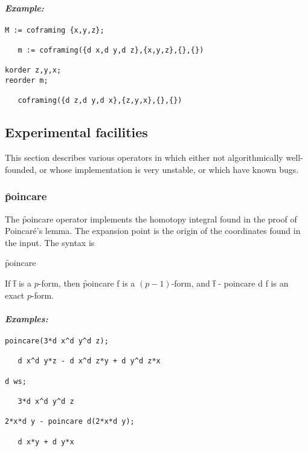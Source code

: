 \paragraph{\textit{Example:}}
\begin{verbatim}
M := coframing {x,y,z};

   m := coframing({d x,d y,d z},{x,y,z},{},{})

korder z,y,x;
reorder m;

   coframing({d z,d y,d x},{z,y,x},{},{})
\end{verbatim}




\subsection{Experimental facilities}
\label{Experimental facilities}

This section describes various operators in  which either not
algorithmically well-founded, or whose implementation is very unstable, or
which have known bugs.


\subsubsection{\f{poincare}}
\label{poincare}

\hypertarget{operator:POINCARE}{}
The \f{poincare} operator implements the homotopy integral found in the
proof of Poincar{\'e}'s lemma. The expansion point is the origin of the
coordinates found in the input. The syntax is
\begin{syntax}
	\f{poincare} 
\end{syntax}
If \f{f} is a $p$-form, then \f{poincare f} is a $(p-1)$-form, and
\f{f - poincare d f} is an exact $p$-form.

\paragraph{\textit{Examples:}}
\begin{verbatim}
poincare(3*d x^d y^d z);

   d x^d y*z - d x^d z*y + d y^d z*x

d ws;

   3*d x^d y^d z

2*x*d y - poincare d(2*x*d y);

   d x*y + d y*x
\end{verbatim}


